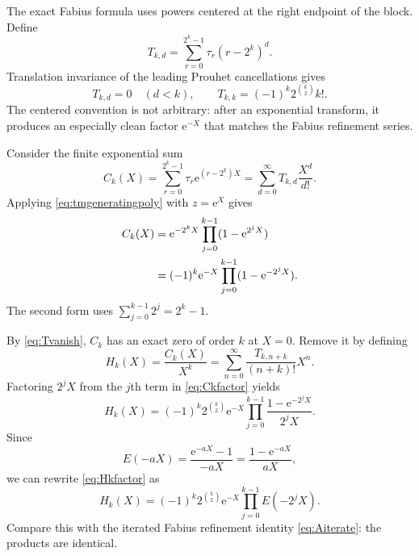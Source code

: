 \documentclass[11pt,oneside]{article}
\theoremstyle{definition}
\theoremstyle{remark}
\newcommand{\e}{\mathrm e}
\newcommand{\tm}{\tau}
\begin{document}
The exact Fabius formula uses powers centered at the right endpoint of the block.  Define
\begin{equation}\label{eq:Tkd}
 T_{k,d}=\sum_{r=0}^{2^k-1}\tm_r(r-2^k)^d.
\end{equation}
Translation invariance of the leading Prouhet cancellations gives
\begin{equation}\label{eq:Tvanish}
 T_{k,d}=0\quad(d<k),
 \qquad
 T_{k,k}=(-1)^k2^{\binom{k}{2}}k!.
\end{equation}
The centered convention is not arbitrary: after an exponential transform, it produces an especially clean factor $\e^{-X}$ that matches the Fabius refinement series.

Consider the finite exponential sum
\begin{equation}\label{eq:Ckdef}
 C_k(X)=\sum_{r=0}^{2^k-1}\tm_r\e^{(r-2^k)X}
       =\sum_{d=0}^{\infty}T_{k,d}\frac{X^d}{d!}.
\end{equation}
Applying \eqref{eq:tmgeneratingpoly} with $z=\e^X$ gives
\begin{align}
 C_k(X)
 &=\e^{-2^kX}\prod_{j=0}^{k-1}(1-\e^{2^jX})\notag\\
 &=(-1)^k\e^{-X}\prod_{j=0}^{k-1}(1-\e^{-2^jX}).
 \label{eq:Ckfactor}
\end{align}
The second form uses $\sum_{j=0}^{k-1}2^j=2^k-1$.

By \eqref{eq:Tvanish}, $C_k$ has an exact zero of order $k$ at $X=0$.  Remove it by defining
\begin{equation}\label{eq:Hkdef}
 H_k(X)=\frac{C_k(X)}{X^k}
       =\sum_{n=0}^{\infty}
         \frac{T_{k,n+k}}{(n+k)!}X^n.
\end{equation}
Factoring $2^jX$ from the $j$th term in \eqref{eq:Ckfactor} yields
\begin{equation}\label{eq:Hkfactor}
 \boxed{
 H_k(X)=(-1)^k2^{\binom{k}{2}}\e^{-X}
 \prod_{j=0}^{k-1}
 \frac{1-\e^{-2^jX}}{2^jX}.}
\end{equation}
Since
\begin{equation}\label{eq:Enegative}
 E(-aX)=\frac{\e^{-aX}-1}{-aX}
       =\frac{1-\e^{-aX}}{aX},
\end{equation}
we can rewrite \eqref{eq:Hkfactor} as
\begin{equation}\label{eq:HkE}
 \boxed{
 H_k(X)=(-1)^k2^{\binom{k}{2}}\e^{-X}
 \prod_{j=0}^{k-1}E(-2^jX).}
\end{equation}
Compare this with the iterated Fabius refinement identity \eqref{eq:Aiterate}: the products are identical.
\end{document}
